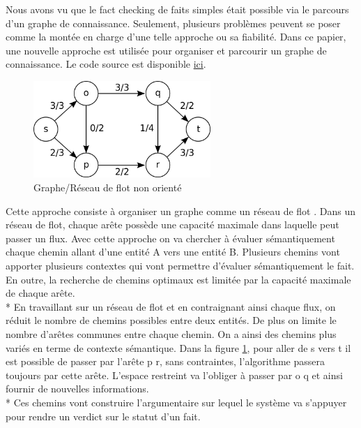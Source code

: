 Nous avons vu que le fact checking de faits simples était possible via le parcours d'un graphe de connaissance. Seulement, plusieurs problèmes peuvent se poser comme la montée en charge d'une telle approche ou sa fiabilité. Dans ce papier, une nouvelle approche est utilisée pour organiser et parcourir un graphe de connaissance. Le code source est disponible \href{https://github.com/shiralkarprashant/knowledgestream}{ici}.

\begin{figure}
  \begin{center}
    \includegraphics[width=0.6\textwidth]{imgs/max_flow.png}
  \end{center}
  \caption{Graphe/Réseau de flot non orienté}
  \label{max_flow}
\end{figure}

Cette approche consiste à organiser un graphe comme un réseau de flot \cite{shiralkar2017finding}. Dans un réseau de flot, chaque arête possède une capacité maximale dans laquelle peut passer un flux. Avec cette approche on va chercher à évaluer sémantiquement chaque chemin allant d'une entité A vers une entité B. Plusieurs chemins vont apporter plusieurs contextes qui vont permettre d'évaluer sémantiquement le fait. En outre, la recherche de chemins optimaux est limitée par la capacité maximale de chaque arête. 
\\*
En travaillant sur un réseau de flot et en contraignant ainsi chaque flux, on réduit le nombre de chemins possibles entre deux entités. De plus on limite le nombre d'arêtes communes entre chaque chemin. On a ainsi des chemins plus variés en terme de contexte sémantique. Dans la figure \ref{max_flow}, pour aller de s vers t il est possible de passer par l'arête p \textrightarrow r, sans contraintes, l'algorithme passera toujours par cette arête. L'espace restreint va l'obliger à passer par o \textrightarrow q et ainsi fournir de nouvelles informations.
\\*
Ces chemins vont construire l'argumentaire sur lequel le système va s'appuyer pour rendre un verdict sur le statut d'un fait.

